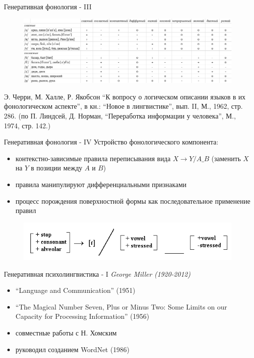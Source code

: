 \documentclass{beamer}
\begin{document}
\begin{frame}{Генеративная фонология - III}
\begin{center}
	\begin{figure}[H]
		\includegraphics[scale=0.32]{phonemes.png} 
	\end{figure}
\end{center}
\bigskip
\tiny{Э. Черри, М. Халле, Р. Якобсон ``К вопросу о логическом описании языков в их фонологическом аспекте'', в кн.: ``Новое в лингвистике'', вып. II, М., 1962, стр. 286. (по П. Линдсей, Д. Норман, ``Переработка информации у человека'', М., 1974, стр. 142.)}
\end{frame}

\begin{frame}{Генеративная фонология - IV}
Устройство фонологического компонента: 
\bigskip
\begin{itemize}
	\item контекстно-зависимые правила переписывания вида $X \to Y / A \_ B$ (заменить $X$ на $Y$ в позиции между $A$ и $B$)
	\medskip
	\item правила манипулируют дифференциальными признаками
	\medskip
	\item процесс порождения поверхностной формы как последовательное применение правил
\end{itemize}
\begin{center}
	\begin{figure}[H]
		\includegraphics[scale=0.5]{alveolar_flap.png} 
	\end{figure}
\end{center}
\end{frame}

\begin{frame}{Генеративная психолингвистика - I}
\textit{George Miller (1920-2012)}
\bigskip
\begin{itemize}
	\item ``Language and Communication'' (1951)
	\medskip
	\item ``The Magical Number Seven, Plus or Minus Two: Some Limits on our Capacity for Processing Information'' (1956)
	\medskip
	\item совместные работы с Н. Хомским
	\medskip
	\item руководил созданием WordNet (1986)
\end{itemize}
\end{frame}
\end{document}
